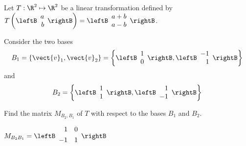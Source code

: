 \begin{enumialphparenastyle}
\begin{ex}
Let $T: \R^2 \mapsto \R^2$ be a linear transformation defined by $T \left( \leftB \begin{array}{r}
a \\
b
\end{array} \rightB \right) = \leftB \begin{array}{r}
a+b \\
a-b
\end{array} \rightB$. 

Consider the two bases
\[
B_1 = \left\{ \vect{v}_{1}, \vect{v}_{2} \right\} = \left\{ \leftB \begin{array}{r}
1 \\
0
\end{array}\rightB, \leftB \begin{array}{r}
-1 \\
1
\end{array}
\rightB
\right\}
\]
 and 
\[
B_2 = \left\{ \leftB \begin{array}{r}
1 \\
1
\end{array}
\rightB, \leftB \begin{array}{r}
1 \\
-1
\end{array}
\rightB
\right\}
\]

Find the matrix $M_{B_2,B_1}$ of $T$ with respect to the bases $B_1$ and $B_2$. 
\begin{sol}
$
M_{B_{2} B_{1}} = \leftB
\begin{array}{rr}
\vspace{0.05in}1 & 0 \\
\vspace{0.05in}-1 & 1 
\end{array}
\rightB $
\end{sol}
\end{ex}

\end{enumialphparenastyle}
